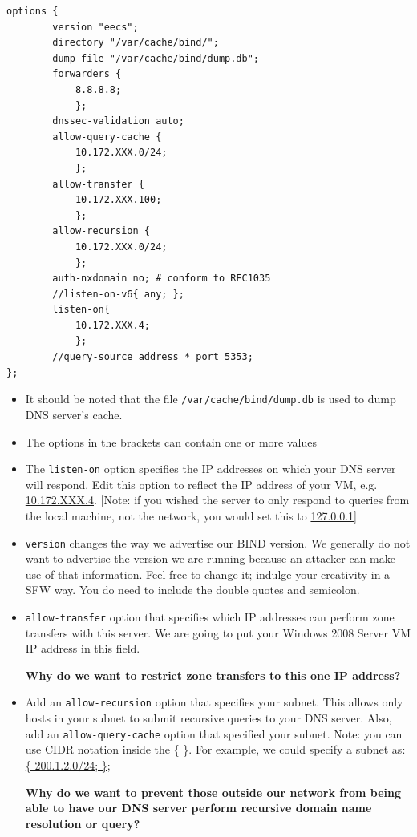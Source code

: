 \documentclass{article}
\begin{document}
\begin{verbatim}
options {
	    version "eecs";	
	    directory "/var/cache/bind/";
	    dump-file "/var/cache/bind/dump.db";
	    forwarders {
	        8.8.8.8;
	        };
	    dnssec-validation auto;
	    allow-query-cache {
	        10.172.XXX.0/24;
	        };
	    allow-transfer {
	        10.172.XXX.100;
	        };
	    allow-recursion {
	        10.172.XXX.0/24;
	        };
	    auth-nxdomain no; # conform to RFC1035
	    //listen-on-v6{ any; };
	    listen-on{ 
	        10.172.XXX.4;
	        };
	    //query-source address * port 5353;
};
\end{verbatim}
\begin{itemize}
\item It should be noted that the file \texttt{/var/cache/bind/dump.db} is used to dump DNS server's cache.
\item The options in the brackets can contain one or more values 
\item The {\tt listen-on} option specifies the IP addresses on which your DNS server will respond. Edit this option to reflect the IP address of your \ubuntu VM, e.g. \url{10.172.XXX.4}.   [Note: if you wished the server to only respond to queries from the local machine, not the network, you would set this to \url{127.0.0.1}]
\item  {\tt version} changes the way we advertise our BIND version.  We generally do not want to advertise the version we are running because an attacker can make use of that information. Feel free to change it; indulge your creativity in a SFW way. You do need to include the double quotes and semicolon.
\item {\tt allow-transfer} option that specifies which IP addresses can perform zone transfers with this server.  We are going to put your Windows 2008 Server VM IP address in this field.

\textbf{ \question Why do we want to restrict zone transfers to this one IP address?}
\item Add an {\tt allow-recursion} option that specifies your subnet. This allows only hosts in your subnet to submit recursive queries to your DNS server.  Also, add an {\tt allow-query-cache} option that specified your subnet. 
Note: you can use CIDR notation inside the \{ \}. For example, we could specify a subnet as: \\
\url{{ 200.1.2.0/24; }; }

\textbf{ \question  Why do we want to prevent those outside our network from being able to have our DNS server perform recursive domain name resolution or query?}


\end{itemize}
\end{document}
